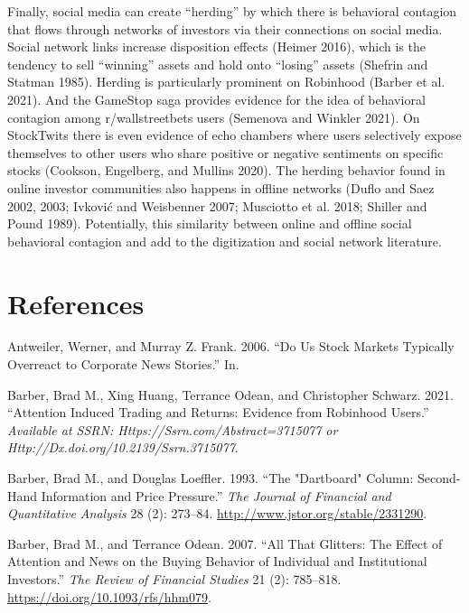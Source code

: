 \documentclass[12pt,]{article}
\begin{document}
Finally, social media can create ``herding'' by which there is
behavioral contagion that flows through networks of investors via their
connections on social media. Social network links increase disposition
effects (Heimer 2016), which is the tendency to sell ``winning'' assets
and hold onto ``losing'' assets (Shefrin and Statman 1985). Herding is
particularly prominent on Robinhood (Barber et al. 2021). And the
GameStop saga provides evidence for the idea of behavioral contagion
among r/wallstreetbets users (Semenova and Winkler 2021). On StockTwits
there is even evidence of echo chambers where users selectively expose
themselves to other users who share positive or negative sentiments on
specific stocks (Cookson, Engelberg, and Mullins 2020). The herding
behavior found in online investor communities also happens in offline
networks (Duflo and Saez 2002, 2003; Ivković and Weisbenner 2007;
Musciotto et al. 2018; Shiller and Pound 1989). Potentially, this
similarity between online and offline social behavioral contagion and
add to the digitization and social network literature.

\hypertarget{references}{%
\section*{References}\label{references}}

\hypertarget{refs}{}
\leavevmode\hypertarget{ref-antweiler2006}{}%
Antweiler, Werner, and Murray Z. Frank. 2006. ``Do Us Stock Markets
Typically Overreact to Corporate News Stories.'' In.

\leavevmode\hypertarget{ref-barber2021}{}%
Barber, Brad M., Xing Huang, Terrance Odean, and Christopher Schwarz.
2021. ``Attention Induced Trading and Returns: Evidence from Robinhood
Users.'' \emph{Available at SSRN: Https://Ssrn.com/Abstract=3715077 or
Http://Dx.doi.org/10.2139/Ssrn.3715077}.

\leavevmode\hypertarget{ref-barber1993}{}%
Barber, Brad M., and Douglas Loeffler. 1993. ``The "Dartboard" Column:
Second-Hand Information and Price Pressure.'' \emph{The Journal of
Financial and Quantitative Analysis} 28 (2): 273--84.
\url{http://www.jstor.org/stable/2331290}.

\leavevmode\hypertarget{ref-barber2007}{}%
Barber, Brad M., and Terrance Odean. 2007. ``All That Glitters: The
Effect of Attention and News on the Buying Behavior of Individual and
Institutional Investors.'' \emph{The Review of Financial Studies} 21
(2): 785--818. \url{https://doi.org/10.1093/rfs/hhm079}.
\end{document}
